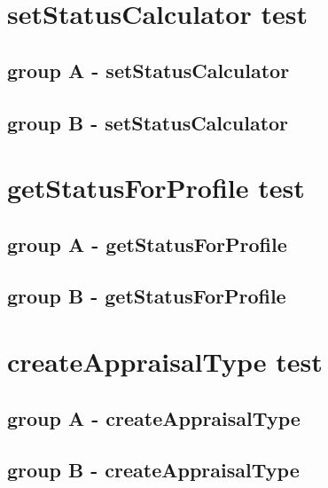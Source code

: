 \documentclass[a4paper,11pt]{article}
\begin{document}
\newpage
\section{setStatusCalculator test}
\subsection{group A - setStatusCalculator}


\subsection{group B - setStatusCalculator}



\newpage
\section{getStatusForProfile test}
\subsection{group A - getStatusForProfile}


\subsection{group B - getStatusForProfile}



\newpage
\section{createAppraisalType test}
\subsection{group A - createAppraisalType}

\subsection{group B - createAppraisalType}
\end{document}
